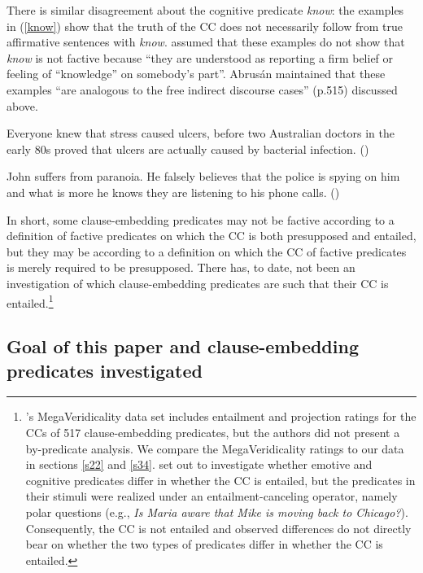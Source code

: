 \documentclass[11pt,fleqn]{article}
\newcommand{\6}{\mbox{$[\hspace*{-.6mm}[$}}
\newcommand{\9}{\mbox{$]\hspace*{-.6mm}]$}}
\newcommand{\citepos}[1]{\citeauthor{#1}'s \citeyear{#1}}
\begin{document}
There is similar disagreement about the cognitive predicate {\em know}: the examples in (\ref{know}) show that the truth of the CC does not necessarily follow from true affirmative sentences with {\em know}. \citet{abrusan2011} assumed that these examples do not show that {\em know} is not factive because ``they are understood as reporting a firm belief or feeling of ``knowledge'' on somebody's part''. Abrus\'an maintained that these examples ``are analogous to the free indirect discourse cases'' (p.515) discussed above.

\begin{exe}
\ex\label{know}
\begin{xlist}
\ex Everyone knew that stress caused ulcers, before two Australian doctors in the early 80s proved that ulcers are actually caused by bacterial infection. \hfill (\citealt[501]{hazlett2010})

\ex John suffers from paranoia. He falsely believes that the police is spying on him and what is more he knows they are listening to his phone calls. \hfill (\citealt[514]{abrusan2011})
\end{xlist}
\end{exe}

In short, some clause-embedding predicates may not be factive according to a definition of factive predicates on which the CC is both presupposed and entailed, but they may be according to a definition on which the CC of factive predicates is merely required to be presupposed. There has, to date, not been an investigation of which clause-embedding predicates are such that their CC is entailed.\footnote{\citepos{white-rawlins-nels2018} MegaVeridicality data set includes entailment and projection ratings for the CCs of 517 clause-embedding predicates, but the authors did not present a by-predicate analysis. We compare the MegaVeridicality ratings to our data in sections \ref{s22} and  \ref{s34}. \citet{djaerv-etal2016} set out to investigate whether emotive and cognitive predicates differ in whether the CC is entailed, but the predicates in their stimuli were realized under an entailment-canceling operator, namely polar questions (e.g., {\em Is Maria aware that Mike is moving back to Chicago?}). Consequently, the CC is not entailed and observed differences do not directly bear on whether the two types of predicates differ in whether the CC is entailed.} 

\subsection{Goal of this paper and clause-embedding predicates investigated}
\end{document}
